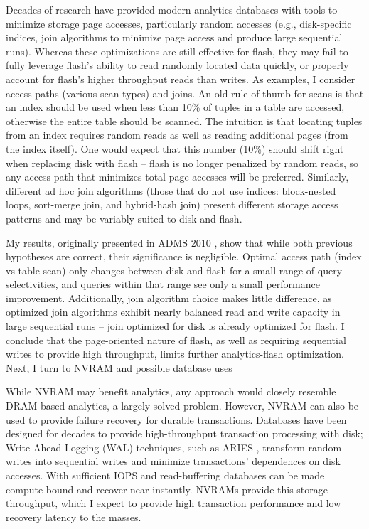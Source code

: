 Decades of research have provided modern analytics databases with tools to minimize storage page accesses, particularly random accesses (e.g., disk-specific indices, join algorithms to minimize page access and produce large sequential runs).
Whereas these optimizations are still effective for flash, they may fail to fully leverage flash's ability to read randomly located data quickly, or properly account for flash's higher throughput reads than writes.
As examples, I consider access paths (various scan types) and joins.
An old rule of thumb for scans is that an index should be used when less than 10\% of tuples in a table are accessed, otherwise the entire table should be scanned.
The intuition is that locating tuples from an index requires random reads as well as reading additional pages (from the index itself).
One would expect that this number (10\%) should shift right when replacing disk with flash -- flash is no longer penalized by random reads, so any access path that minimizes total page accesses will be preferred.
Similarly, different ad hoc join algorithms (those that do not use indices: block-nested loops, sort-merge join, and hybrid-hash join) present different storage access patterns and may be variably suited to disk and flash.

My results, originally presented in ADMS 2010 , show that while both previous hypotheses are correct, their significance is negligible.
Optimal access path (index vs table scan) only changes between disk and flash for a small range of query selectivities, and queries within that range see only a small performance improvement.
Additionally, join algorithm choice makes little difference, as optimized join algorithms exhibit nearly balanced read and write capacity in large sequential runs -- join optimized for disk is already optimized for flash.
I conclude that the page-oriented nature of flash, as well as requiring sequential writes to provide high throughput, limits further analytics-flash optimization.
Next, I turn to NVRAM and possible database uses

While NVRAM may benefit analytics, any approach would closely resemble DRAM-based analytics, a largely solved problem.
However, NVRAM can also be used to provide failure recovery for durable transactions.
Databases have been designed for decades to provide high-throughput transaction processing with disk; Write Ahead Logging (WAL) techniques, such as ARIES , transform random writes into sequential writes and minimize transactions' dependences on disk accesses.
With sufficient IOPS and read-buffering databases can be made compute-bound and recover near-instantly.
NVRAMs provide this storage throughput, which I expect to provide high transaction performance and low recovery latency to the masses.

